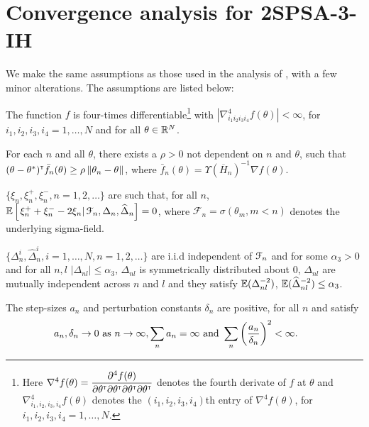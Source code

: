 \section{Convergence analysis for 2SPSA-3-IH}
\label{sec:2spsa-results}
We make the same assumptions as those used in the analysis of \cite{prashanth2015rdsa}, with a few minor alterations. The assumptions are listed below:
\begin{pvn}
\item  The function
$f$ is four-times differentiable\footnote{Here $\nabla^4 f(\theta) = \dfrac{\partial^4 f (\theta)}{\partial \theta^\mathsf{\scriptscriptstyle T} \partial \theta^\mathsf{\scriptscriptstyle T} \partial \theta^\mathsf{\scriptscriptstyle T} \partial \theta^\mathsf{\scriptscriptstyle T}}$ denotes the fourth derivate of $f$ at $\theta$ and $\nabla^4_{i_1, i_2, i_3, i_4} f(\theta)$ denotes the $(i_1, i_2, i_3, i_4)$th entry of $\nabla^4 f(\theta)$, for $i_1, i_2, i_3,i_4=1,\ldots, N$.} with $\left|\nabla^4_{i_1 i_2 i_3 i_4} f(\theta) \right| < \infty$, for $i_1, i_2, i_3,i_4=1,\ldots, N$ and for all $\theta\in \mathbb{R}^N$. 


\item For each $n$ and all $\theta$, there exists a $\rho>0$ not dependent on $n$ and $\theta$, such that $(\theta-\theta^*)^\mathsf{\scriptscriptstyle T} \bar f_n(\theta) \ge \rho \left\| \theta_n - \theta\right\|$, where $\bar f_n(\theta) = \Upsilon(\overline H_n)^{-1} \nabla f(\theta)$.

\item $\{\xi_n, \xi_n^+,\xi_n^-, n=1,2,\ldots\}$ are such that, for all $n$, $\mathbb{E}\left[\left. \xi_n^+ + \xi_n^- - 2 \xi_n \right| \mathcal{F}_n, \Delta_n, \widehat \Delta_n \right] = 0$, where $\mathcal{F}_n = \sigma(\theta_m,m < n)$ denotes the underlying sigma-field.

\item $\{\Delta_n^i,\widehat\Delta_n^i, i=1,\ldots,N, n=1,2,\ldots\}$ are i.i.d independent of $\mathcal{F}_n$ and for some $\alpha_3 > 0$ and for all $n,l$ $|\Delta_{nl}|\le \alpha_3$, $\Delta_{nl}$ is symmetrically distributed about 0, $\Delta_{nl}$ are mutually independent across $n$ and $l$ and they satisfy $\mathbb{E} (\Delta_{nl}^{-2})$, $\mathbb{E} (\widehat\Delta_{nl}^{-2}) \le \alpha_3$.

\item  The step-sizes $a_n$ and perturbation constants $\delta_n$ are positive, for all $n$ and satisfy
$$\hspace{-1.7em} a_n, \delta_n \rightarrow 0\text{ as } n \rightarrow \infty, 
\sum_n a_n=\infty \text{ and } \sum_n \left(\frac{a_n}{\delta_n}\right)^2 <\infty.$$


\end{pvn}
